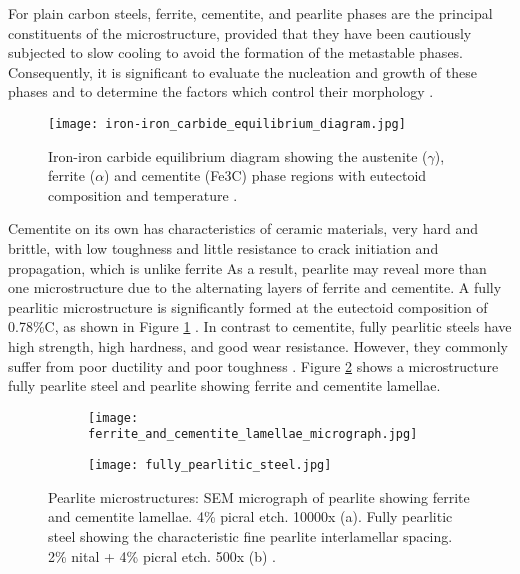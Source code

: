 For plain carbon steels, ferrite, cementite, and pearlite phases are the principal constituents of the microstructure, provided that they have been cautiously subjected to slow cooling to avoid the formation of the metastable phases. Consequently, it is significant to evaluate the nucleation and growth of these phases and to determine the factors which control their morphology \cite{bhadeshia2017steels}.

\begin{figure}[H]
    \centering
    \texttt{[image: iron-iron\_carbide\_equilibrium\_diagram.jpg]}
    \caption{Iron-iron carbide equilibrium diagram showing the austenite ($\gamma$), ferrite ($\alpha$) and cementite (Fe3C) phase regions with eutectoid composition and temperature \cite{cmrp2014maintenance}.}
    \label{ch3:figure:equilibrium}
\end{figure}

Cementite on its own has characteristics of ceramic materials, very hard and brittle, with low toughness and little resistance to crack initiation and propagation, which is unlike ferrite \cite{bajaj2020steels} As a result, pearlite may reveal more than one microstructure due to the alternating layers of ferrite and cementite. A fully pearlitic microstructure is significantly formed at the eutectoid composition of 0.78\%C, as shown in Figure \ref{ch3:figure:equilibrium} \cite{molabe2018determining}. In contrast to cementite, fully pearlitic steels have high strength, high hardness, and good wear resistance. However, they commonly suffer from poor ductility and poor toughness \cite{molabe2018determining}. Figure \ref{ch3:figure:pearlite:microstructures} shows a microstructure fully pearlite steel and pearlite showing ferrite and cementite lamellae.

\begin{figure}[H]

\centering
\begin{subfigure}{.45\textwidth}
    \centering
    \texttt{[image: ferrite\_and\_cementite\_lamellae\_micrograph.jpg]}
    \caption{}
\end{subfigure}
\begin{subfigure}{.45\textwidth}
    \centering
    \texttt{[image: fully\_pearlitic\_steel.jpg]}
    \caption{}
\end{subfigure}

\caption{Pearlite microstructures:  SEM micrograph of pearlite showing ferrite and cementite lamellae. 4\% picral etch. 10000x (a). Fully pearlitic steel showing the characteristic fine pearlite interlamellar spacing. 2\% nital + 4\% picral etch. 500x (b) \cite{molabe2018determining}.}
\label{ch3:figure:pearlite:microstructures}
\end{figure}

